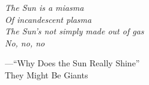 
\begin{dedication} 
\epigraph{
    \onehalfspacing
    \textit{
    The Sun is a miasma\\
    Of incandescent plasma\\
    The Sun's not simply made out of gas\\
    No, no, no
}}
{
    \singlespacing
    ---``Why Does the Sun Really Shine''\\They Might Be Giants
}

\end{dedication}

